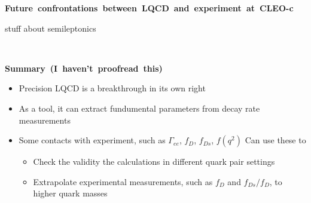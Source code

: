 \documentclass[landscape]{article}
\newenvironment{slide}[1][ ]{\mbox{\bf #1 } \vfill}{\vfill \mbox{ } \pagebreak}
\begin{document}
\begin{slide}[Future confrontations between LQCD and experiment at CLEO-c]

  stuff about semileptonics

\end{slide}







\begin{slide}[Summary (I haven't proofread this)]

\vspace{0.5 cm}
\begin{itemize}\setlength{\itemsep}{0.5 cm}

  \item Precision LQCD is a breakthrough in its own right

  \item As a tool, it can extract fundumental parameters from decay rate
    measurements

  \item Some contacts with experiment, such as $\Gamma_{ee}$, $f_D$, $f_{Ds}$, $f(q^2)$
    Can use these to

    \vspace{0.3 cm}
    \begin{itemize}\setlength{\itemsep}{0.5 cm}

      \item Check the validity the calculations in different quark pair
      settings

      \item Extrapolate experimental measurements, such as $f_D$ and $f_{Ds}/f_D$,
      to higher quark masses

    \end{itemize}

\end{itemize}

\end{slide}
\end{document}
